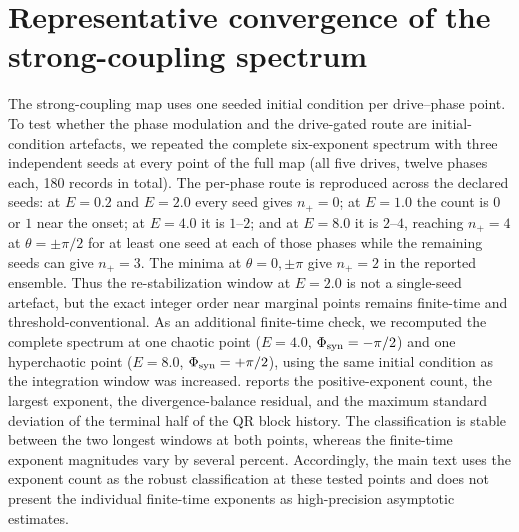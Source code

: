 \documentclass[Phys]{SciPost}
\begin{document}
\section{Representative convergence of the strong-coupling spectrum}
\label{SI-sec:convergence}

The strong-coupling map uses one seeded initial condition per drive--phase
point. To test whether the phase modulation and the drive-gated route are
initial-condition artefacts, we repeated the complete six-exponent spectrum with
three independent seeds at every point of the full map (all five drives, twelve
phases each, \num{180} records in total). The per-phase route is reproduced across the declared seeds: at $E=\num{0.2}$
and $E=\num{2.0}$ every seed gives $n_{+}=0$; at $E=\num{1.0}$ the count is
$0$ or $1$ near the onset; at $E=\num{4.0}$ it is $1$--$2$; and at
$E=\num{8.0}$ it is $2$--$4$, reaching $n_{+}=4$ at $\theta=\pm\pi/2$
for at least one seed at each of those phases while the remaining seeds can
give $n_{+}=3$. The minima at $\theta=0,\pm\pi$ give $n_{+}=2$ in the
reported ensemble. Thus the re-stabilization window at $E=\num{2.0}$ is not a
single-seed artefact, but the exact integer order near marginal points remains
finite-time and threshold-conventional.
As an additional finite-time check, we recomputed the complete spectrum at one
chaotic point ($E=\num{4.0}$, $\Phi_{\rm syn}=-\pi/2$) and one hyperchaotic point
($E=\num{8.0}$, $\Phi_{\rm syn}=+\pi/2$), using the same initial condition as the
integration window was increased.  reports the
positive-exponent count, the largest exponent, the divergence-balance residual, and
the maximum standard deviation of the terminal half of the QR block history. The
classification is stable between the two longest windows at both points, whereas
the finite-time exponent magnitudes vary by several percent. Accordingly, the
main text uses the exponent count as the robust classification at these tested
points and does not present the individual finite-time exponents as high-precision
asymptotic estimates.
\end{document}
